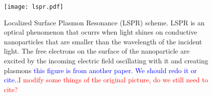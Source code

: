 
\begin{figure}[h] %
   \centering
   \texttt{[image: lspr.pdf]} 
   \caption{Localized Surface Plasmon Resonance (LSPR) scheme. LSPR is an 
            optical phenomenon that ocurrs when light shines on conductive 
            nanoparticles that are smaller than the wavelength of the incident 
            light. The free electrons on the surface of the nanoparticle are 
            excited by the incoming electric field oscillating with it and 
            creating plasmons \textcolor{blue}{this figure is from another paper. We should redo it or cite.}.\textcolor{red}{I modify some things of the original picture, do we still need to cite?}}
   \label{fig:lspr}
\end{figure}




